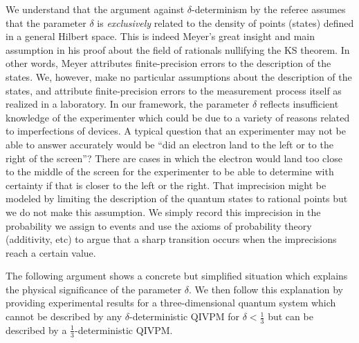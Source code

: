 \documentclass[english,reprint, aps, prl,superscriptaddress, showpacs,
showkeys, longbibliography, amsmath, amssymb, floatfix]{revtex4-1}
\theoremstyle{plain}
\theoremstyle{definition}
\begin{document}
We understand that the argument against $\delta$-determinism by the
referee assumes that the parameter $\delta$ is \emph{exclusively}
related to the density of points (states) defined in a general Hilbert
space. This is indeed Meyer's great insight and main assumption in
his proof about the field of rationals nullifying the KS theorem.
In other words, Meyer attributes finite-precision errors to the description
of the states. We, however, make no particular assumptions about the
description of the states, and attribute finite-precision errors to
the measurement process itself as realized in a laboratory. In our
framework, the parameter $\delta$ reflects insufficient knowledge
of the experimenter which could be due to a variety of reasons related
to imperfections of devices. A typical question that an experimenter
may not be able to answer accurately would be ``did an electron land
to the left or to the right of the screen''? There are cases in which
the electron would land too close to the middle of the screen for
the experimenter to be able to determine with certainty if that is
closer to the left or the right. That imprecision might be modeled
by limiting the description of the quantum states to rational points
but we do not make this assumption. We simply record this imprecision
in the probability we assign to events and use the axioms of probability
theory (additivity, etc) to argue that a sharp transition occurs when
the imprecisions reach a certain value. 

The following argument shows a concrete but simplified situation which
explains the physical significance of the parameter $\delta$. We
then follow this explanation by providing experimental results for
a three-dimensional quantum system which cannot be described by any
$\delta$-deterministic QIVPM for $\delta<\frac{1}{3}$ but can be
described by a $\frac{1}{3}$-deterministic QIVPM.
\end{document}
